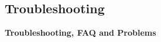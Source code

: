 \documentclass[a4paper]{article}
\begin{document}
%
%
%
%
%
%
%
%

\newpage
\subsection{Troubleshooting}
\textbf{Troubleshooting, FAQ and Problems} \\
\end{document}
